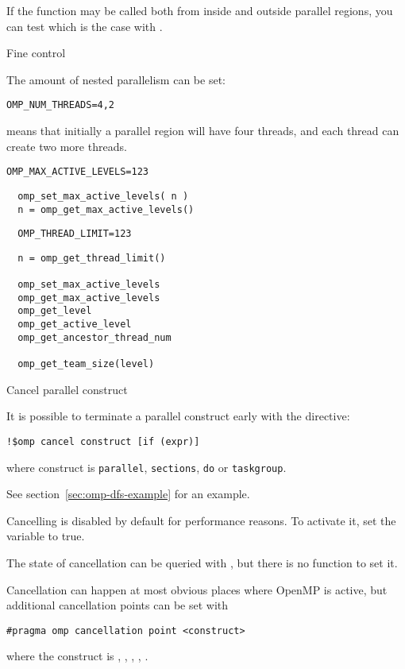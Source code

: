 If the function may be called both from inside and outside parallel
regions, you can test which is the case with .

 {Fine control}

The amount of nested parallelism can be set:
\begin{verbatim}
OMP_NUM_THREADS=4,2
\end{verbatim}
means that initially a parallel region will have four threads, and
each thread can create two more threads.

\begin{verbatim}
OMP_MAX_ACTIVE_LEVELS=123
\end{verbatim}

\begin{lstlisting}
  omp_set_max_active_levels( n )
  n = omp_get_max_active_levels()
\end{lstlisting}

\begin{verbatim}
  OMP_THREAD_LIMIT=123
\end{verbatim}

\begin{lstlisting}
  n = omp_get_thread_limit()

  omp_set_max_active_levels
  omp_get_max_active_levels
  omp_get_level
  omp_get_active_level
  omp_get_ancestor_thread_num

  omp_get_team_size(level)
\end{lstlisting}


 {Cancel parallel construct}
\label{sec:omp-cancel}

It is possible to terminate a parallel construct early
with the  directive:
\begin{lstlisting}
!$omp cancel construct [if (expr)]
\end{lstlisting}
where construct is
\lstinline{parallel},
\lstinline{sections},
\lstinline{do}
or
\lstinline{taskgroup}.

See section~\ref{sec:omp-dfs-example} for an example.

Cancelling is disabled by default for performance reasons.
To activate it, set the  variable to true.

The state of cancellation can be queried with ,
but there is no function to set it.

Cancellation can happen at most obvious places where OpenMP is active,
but additional cancellation points can be set with 
\begin{lstlisting}
#pragma omp cancellation point <construct>
\end{lstlisting}
where the construct is , ,
, , .

